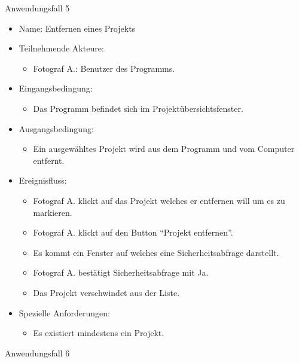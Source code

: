 	\begin{description}
		\item[Anwendungsfall 5]
	\end{description}
	
		\begin{itemize}
			\item Name: Entfernen eines Projekts
			\item Teilnehmende Akteure:
			\begin{itemize}
				\item	Fotograf A.: Benutzer des Programms.	
			\end{itemize}
			\item Eingangsbedingung:
			\begin{itemize}
				\item	Das Programm befindet sich im Projektübersichtsfenster.		
			\end{itemize}
			\item Ausgangsbedingung:
			\begin{itemize}
				\item	Ein ausgewähltes Projekt wird aus dem Programm und vom Computer entfernt.		
			\end{itemize}
			\item Ereignisfluss:
			\begin{itemize}
				\item Fotograf A. klickt auf das Projekt welches er entfernen will um es zu markieren.
				\item Fotograf A. klickt auf den Button "`Projekt entfernen"'.
				\item Es kommt ein Fenster auf welches eine Sicherheitsabfrage darstellt.
				\item Fotograf A. bestätigt Sicherheitsabfrage mit Ja.
				\item Das Projekt verschwindet aus der Liste.
			\end{itemize}
			\item Spezielle Anforderungen:
			\begin{itemize}
				\item	Es existiert mindestens ein Projekt.		
			\end{itemize}			
		\end{itemize}
		
		\begin{description}
			\item[Anwendungsfall 6]
		\end{description}
		
